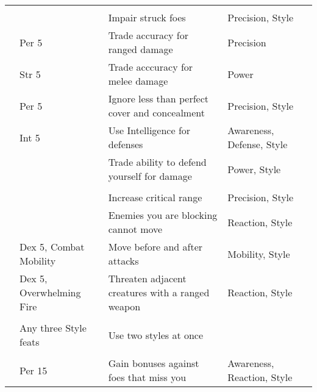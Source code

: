 \begin{longtabuwrapper}
\begin{longtabu}{>{\lcol}p{10em} >{\lcol}p{15em} >{\lcol}X >{\lcol}p{8em} >{\lcol}p{3em}}
        \midrule
         &  &  &  &  \\
         & \x & Impair struck foes & Precision, Style &  \\
         & Per 5 & Trade accuracy for ranged damage & Precision &  \\
         & Str 5 & Trade acccuracy for melee damage & Power &  \\
         & Per 5 & Ignore less than perfect cover and concealment & Precision, Style &  \\
         & Int 5 & Use Intelligence for defenses & Awareness, Defense, Style &  \\
         & \x & Trade ability to defend yourself for damage & Power, Style &  \\

        \midrule
         &  &  &  &  \\
         & \x & Increase critical range & Precision, Style &  \\
         & \x & Enemies you are blocking cannot move & Reaction, Style &  \\
         & Dex 5, Combat Mobility & Move before and after attacks & Mobility, Style &  \\
         & Dex 5, Overwhelming Fire & Threaten adjacent creatures with a ranged weapon & Reaction, Style &  \\

        \midrule
         &  &  &  &  \\
         & Any three Style feats & Use two styles at once & \x &  \\

        \midrule
         &  &  &  &  \\
         & Per 15 & Gain bonuses against foes that miss you & Awareness, Reaction, Style &  \\
    \end{longtabu}
\end{longtabuwrapper}

